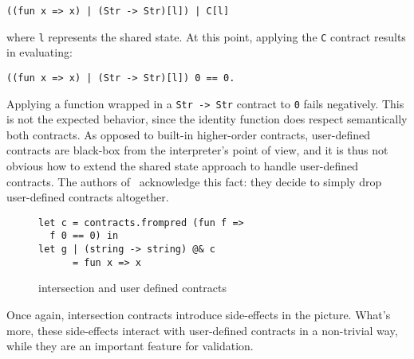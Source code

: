 \documentclass[sigplan,10pt,review,anonymous]{acmart}
\newcommand{\unsure}[2][1=]{}
\newcommand{\nickel}[1]{\lstinline[language=nickel]{#1}}
\begin{document}
\begin{lstlisting}[language=nickel,frame=none,numbers=none,title={Stateful
decomposition}]
((fun x => x) | (Str -> Str)[l]) | C[l]
\end{lstlisting}

where \nickel{l} represents the shared state.  At this point,
applying the \nickel{C} contract results in evaluating:

\begin{lstlisting}[language=nickel,frame=none,numbers=none]
((fun x => x) | (Str -> Str)[l]) 0 == 0.
\end{lstlisting}

Applying a function wrapped in a \nickel{Str -> Str} contract to \nickel{0}
fails negatively. This is not the expected behavior, since the identity function
does respect semantically both contracts. As opposed to built-in higher-order
contracts, user-defined contracts are black-box from the interpreter's point of
view, and it is thus not obvious how to extend the shared state approach to
handle user-defined contracts. The authors of~\cite{RootCauseOfBlame}
acknowledge this fact: they decide to simply drop user-defined contracts
altogether.

\begin{figure}[h]
\begin{lstlisting}[language=nickel]
let c = contracts.frompred (fun f =>
  f 0 == 0) in
let g | (string -> string) @& c
      = fun x => x
\end{lstlisting}
\caption{intersection and user defined contracts}
\label{fig:inter-flat-contracts}
\end{figure}

Once again, intersection contracts introduce side-effects in the picture. What's
more, these side-effects interact with user-defined contracts in a non-trivial
way, while they are an important feature for validation.
\unsure{(Yann) Should we talk about thiemann here, who do support user-defined
contracts?}
\end{document}
